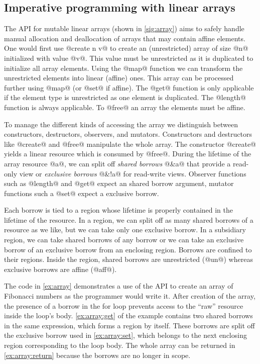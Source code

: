 
\subsection{Imperative programming with linear arrays}
\label{sec:imper-progr}

The API for mutable linear arrays (shown in \cref{sig:array})
aims to safely handle manual allocation and
deallocation of arrays that may contain affine elements.
One would first use @create n v@ to create
an (unrestricted) array of size @n@ initialized with value
@v@. This value must be unrestricted as it is duplicated to
initialize all array elements. Using the @map@ function we
can transform the unrestricted elements into linear (affine)
ones. This array can be processed further using @map@ (or @set@ if
affine). The @get@ function is only applicable if the element type
is unrestricted as one element is duplicated. The @length@
function is always applicable. To @free@ an array the elements must be
affine.

To manage the different kinds of accessing the array we distinguish between constructors, destructors,
observers, and mutators.
Constructors and destructors like @create@ and @free@ manipulate the whole
array. %
The constructor
@create@ yields a linear resource which is consumed by @free@.
During the lifetime of the array resource @a@, we can split
off \emph{shared borrows} @&a@ that provide a read-only
view or \emph{exclusive borrows} @&!a@ for read-write views.
Observer functions such as @length@ and @get@ expect an shared borrow
argument, mutator functions such a @set@ expect
a exclusive borrow.

Each borrow is tied to a region whose lifetime is properly
contained in the lifetime of the resource.
In a region, we can split off as many shared borrows of a resource as
we like, but we can take only one exclusive borrow. In a 
subsidiary region, we can take shared borrows of any
borrow or we can take an exclusive borrow of an exclusive borrow from an
enclosing region. Borrows are confined to their regions. Inside the region,
shared borrows are unrestricted (@un@) whereas exclusive
borrows are affine (@aff@).

The code in \cref{ex:array} demonstrates a use of the API to create an
array of Fibonacci numbers as the programmer would write it. After
creation of the array, the presence of a borrow in the for loop
prevents access to the ``raw'' resource inside the loop's
body. \cref{ex:array:get} of the example contains two shared borrows
in the same expression, which forms a region by itself. These borrows
are split off the exclusive borrow used in \cref{ex:array:set}, which
belongs to the next enclosing region corresponding to the loop body.
The whole array can be returned in \cref{ex:array:return} because  the
borrows are no longer in scope. 

